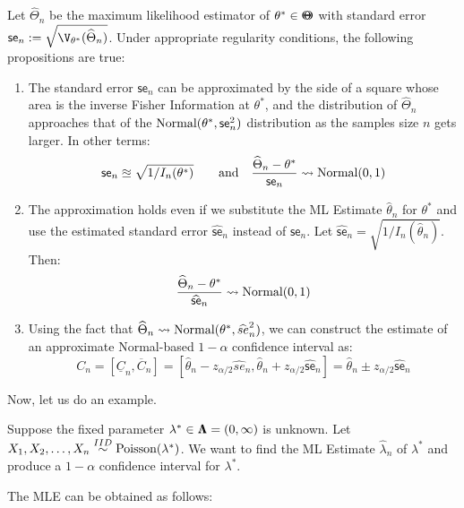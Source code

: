 {\begin{prop}
Let $\widehat{\Theta}_n$ be the maximum likelihood estimator of $\theta^* \in {\Theta}\mspace{-11 mu}{\Theta}$ with standard error $\mathsf{se}_n := \sqrt{\V_{\theta^*} (\widehat{\Theta}_n)}$.  Under appropriate regularity conditions, the following propositions are true:
\begin{enumerate}
\item The standard error $\mathsf{se}_n$ can be approximated by the side of a square whose area is the inverse Fisher Information at $\theta^*$, and the distribution of $\widehat{\Theta}_n$ approaches that of the $\mbox{{\rm Normal}}(\theta^*, \mathsf{se}_n^2)$ distribution as the samples size $n$ gets larger.  In other terms:
\[
\mathsf{se}_n \approxeq \sqrt{1/I_n(\theta^*)} \qquad \text{and} \quad \frac{\widehat{\Theta}_n-\theta^*}{\mathsf{se}_n} \rightsquigarrow \mbox{{\rm Normal}}(0,1)
\]
\item The approximation holds even if we substitute the ML Estimate $\widehat{\theta}_n$ for $\theta^*$ and use the estimated standard error $\widehat{\mathsf{se}}_n$ instead of $\mathsf{se}_n$.  Let $\widehat{\mathsf{se}}_n = \sqrt{1/I_n(\widehat{\theta}_n)}$.  Then:
\[
 \frac{\widehat{\Theta}_n-\theta^*}{\widehat{\mathsf{se}}_n} \rightsquigarrow \mbox{{\rm Normal}}(0,1)
\]
\item Using the fact that $\widehat{\Theta}_n \rightsquigarrow \mbox{{\rm Normal}}(\theta^*,\widehat{se}_n^2)$, we can construct the estimate of an approximate Normal-based $1-\alpha$ confidence interval as:
\[
C_n  =[\underline{C}_n, \overline{C}_n]= [\widehat{\theta}_n - z_{\alpha/2} \widehat{se}_n, \widehat{\theta}_n + z_{\alpha/2} \widehat{\mathsf{se}}_n]= \widehat{\theta}_n \pm z_{\alpha/2} \widehat{\mathsf{se}}_n
\]
\end{enumerate}
\end{prop}
Now, let us do an example.
\begin{example}
Suppose the fixed parameter $\lambda^* \in {\Lambda}\mspace{-11 mu}{\Lambda} = (0,\infty)$ is unknown.  Let $X_1,X_2,\ldots,X_n \overset{IID}{\sim} \mbox{{\rm Poisson}}(\lambda^*)$.  We want to find the ML Estimate $\widehat{\lambda}_n$ of $\lambda^*$ and produce a $1-\alpha$ confidence interval for $\lambda^*$.

The MLE can be obtained as follows:


\end{example}}
